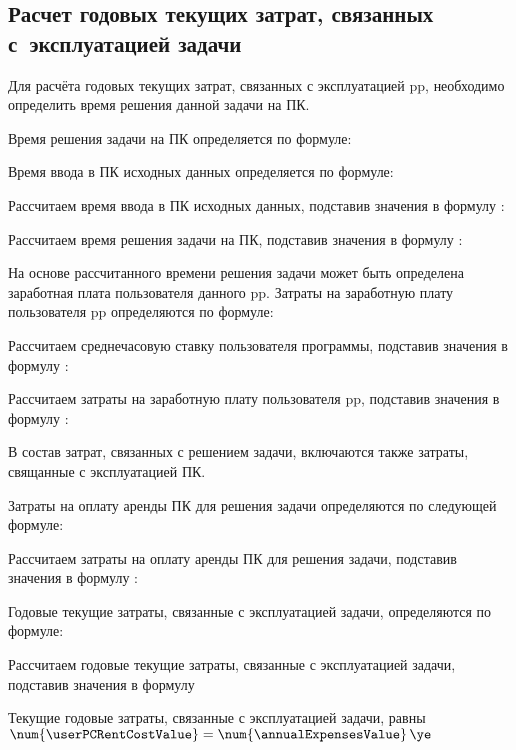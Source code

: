 \subsection{Расчет годовых текущих затрат, связанных с~эксплуатацией задачи}
\label{sec:economics:manualTotalExpenses}

Для расчёта годовых текущих затрат, связанных с эксплуатацией \gls{pp}, необходимо определить время решения данной задачи на ПК.

Время решения задачи на ПК определяется по формуле:
\pcTaskAccomplishTimeCostEquation

Время ввода в ПК исходных данных определяется по формуле:
\manualInputTimeEquation

Рассчитаем время ввода в ПК исходных данных, подставив значения в формулу :
\manualInputTimeFormulaApplied

Рассчитаем время решения задачи на ПК, подставив значения в формулу :
\pcTaskAccomplishTimeCostFormulaApplied

На основе рассчитанного времени решения задачи может быть определена заработная плата пользователя данного \gls{pp}. Затраты на заработную плату пользователя \gls{pp} определяются по формуле:
\userSalaryEquation

Рассчитаем среднечасовую ставку пользователя программы, подставив значения в формулу :
\userRateFormulaApplied

Рассчитаем затраты на заработную плату пользователя \gls{pp}, подставив значения в формулу :
\userSalaryFormulaApplied

В состав затрат, связанных с решением задачи, включаются также затраты, свящанные с эксплуатацией ПК.

Затраты на оплату аренды ПК для решения задачи определяются по следующей формуле:
\userPCRentCostEquation

Рассчитаем затраты на оплату аренды ПК для решения задачи, подставив значения в формулу :
\userPCRentCostFormulaApplied

Годовые текущие затраты, связанные с эксплуатацией задачи, определяются по формуле:
\annualExpensesEquation

Рассчитаем годовые текущие затраты, связанные с эксплуатацией задачи, подставив значения в формулу 
\annualExpensesFormulaApplied

Текущие годовые затраты, связанные с эксплуатацией задачи, равны \(\num{\userPCRentCostValue} = \num{\annualExpensesValue} \, \ye\)